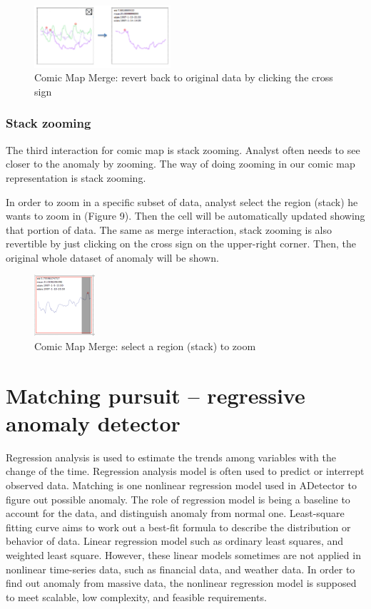 \documentclass{vgtc}                          %
\begin{document}
 \begin{figure}[htb]
	\centering
  \includegraphics[width=0.45\textwidth]{merge2.jpg}
  \caption{Comic Map Merge: revert back to original data by clicking the cross sign}
\end{figure}

\subsubsection{Stack zooming}
The third interaction for comic map is stack zooming. Analyst often needs to see closer to the anomaly by zooming. The way of doing zooming in our comic map representation is stack zooming.

In order to zoom in a specific subset of data, analyst select the region (stack) he wants to zoom in (Figure 9). Then the cell will be automatically updated showing that portion of data. 
The same as merge interaction, stack zooming is also revertible by just clicking on the cross sign on the upper-right corner. Then, the original whole dataset of anomaly will be shown.

 \begin{figure}[htb]
	\centering
  \includegraphics[width=0.20\textwidth]{zoom.jpg}
  \caption{Comic Map Merge: select a region (stack) to zoom}
\end{figure}

\section{Matching pursuit -- regressive anomaly detector}

Regression analysis is used to estimate the trends among variables with the change of the time. Regression analysis model is often used to predict or interrept observed data. Matching is one nonlinear regression model used in ADetector to figure out possible anomaly. The role of regression model is being a baseline to account for the data, and distinguish anomaly from normal one. Least-square fitting curve aims to work out a best-fit formula to describe the distribution or behavior of data. Linear regression model such as ordinary least squares, and weighted least square. However, these linear models sometimes are not applied in nonlinear time-series data, such as financial data, and weather data. In order to find out anomaly from massive data, the nonlinear regression model is supposed to meet scalable, low complexity, and feasible requirements.
\end{document}
